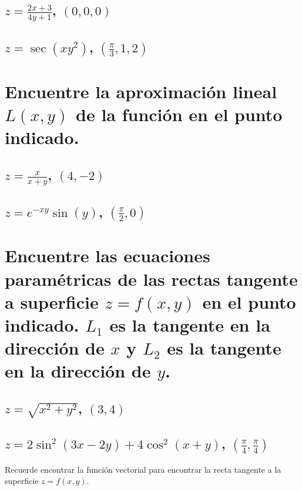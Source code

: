 \documentclass{article}
\begin{document}
\subsection{$\displaystyle z = \frac{2x+3}{4y+1} $, $(0,0,0)$}

\subsection{$\displaystyle z=\sec(xy^2)$, $\left(\frac{\pi }{3},1,2\right)$}



\section{Encuentre la aproximación lineal $L(x,y)$ de la función en el punto indicado.}


\subsection{$\displaystyle z=\frac{x}{x+y} $, $(4,-2)$}

\subsection{$\displaystyle z=e^{-xy}\sin(y)$, $\left(\frac{\pi }{2},0\right)$}



\section{Encuentre las ecuaciones paramétricas de las rectas tangente a superficie $z=f(x,y)$ en el punto indicado. $L_1$ es la tangente en la dirección de $x$ y $L_2$ es la tangente en la dirección de $y$.}


\subsection{$\displaystyle z=\sqrt{x^2+y^2}$, $(3,4 )$}

\subsection{$\displaystyle z=2\sin^2(3x-2y)+4\cos^2(x+y)$, $\left(\frac{\pi }{4}, \frac{\pi }{4}\right)$}
Recuerde encontrar la función vectorial para encontrar la recta tangente a la superficie $z=f(x,y)$.
\end{document}
